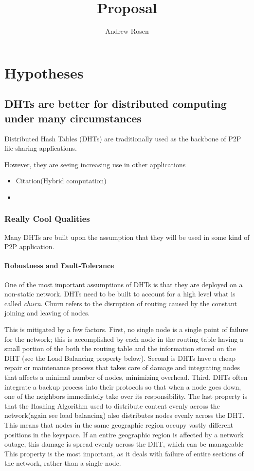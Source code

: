 \documentclass[10pt,letterpaper]{report}
\title{Proposal}
\author{Andrew Rosen}
\begin{document}
\maketitle
\setcounter{tocdepth}{4}
\tableofcontents
\newpage
\chapter{Hypotheses}

\section{DHTs are better for distributed computing under many circumstances}
Distributed Hash Tables (DHTs) are traditionally used as the backbone of P2P file-sharing applications.

However, they are seeing increasing use in other applications
\begin{itemize}
	\item Citation(Hybrid computation)
	\item
\end{itemize}


\subsection{Really Cool Qualities}
Many DHTs are built upon the assumption that they will be used in some kind of P2P application.  
\subsubsection{Robustness and Fault-Tolerance}
One of the most important assumptions of DHTs is that they are deployed on a non-static network.
DHTs need to be built to account for a high level what is called \textit{churn}.  
Churn refers to the disruption of routing caused by the constant joining and leaving of nodes.

This is mitigated by a few factors.  
First, no single node is a single point of failure for the network;  this is accomplished by each node in the routing table having a small portion of the both the routing table and the information stored on the DHT (see the Load Balancing property below).  
Second is DHTs have a cheap repair or maintenance process that takes care of damage and integrating nodes that affects a minimal number of nodes, minimizing overhead. 
Third, DHTs often integrate a backup process into their protocols so that when a node goes down, one of the neighbors immediately take over its responsibility.
The last property is that the Hashing Algorithm used to distribute content evenly across the network(again see load balancing) also distributes nodes evenly across the DHT.  
This means that nodes in the same geographic region occupy vastly different positions in the keyspace.  
If an entire geographic region is affected by a network outage, this damage is spread evenly across the DHT, which can be manageable
This property is the most important, as it deals with failure of entire sections of the network, rather than a single node.
\end{document}
